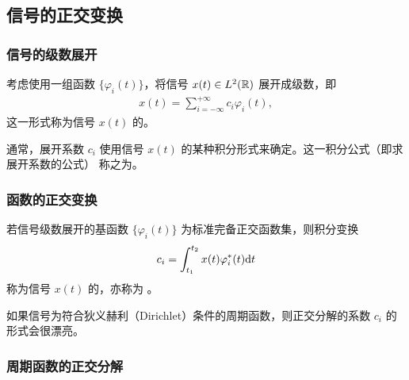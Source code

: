 \subsection{信号的正交变换}

\subsubsection{信号的级数展开}

\begin{definition}[信号的级数展开]
    考虑使用一组函数 $\{\varphi_i(t)\}$，将信号 $x(t) \in L^2(\mathbb{R})$ 展开成级数，即
    \begin{align*}
        x(t) = \sum_{i = -\infty}^{+\infty}c_i\varphi_i(t),
    \end{align*}
    这一形式称为信号 $x(t)$ 的。

    通常，展开系数 $c_i$ 使用信号 $x(t)$ 的某种积分形式来确定。这一积分公式（即求展开系数的公式）
    称之为。
\end{definition}

\subsubsection{函数的正交变换}

\begin{definition}[函数的正交变换]
    若信号级数展开的基函数 $\{\varphi_i(t)\}$ 为标准完备正交函数集，则积分变换
    \begin{align*}
        c_i = \int_{t_1}^{t_2}x(t)\varphi_i^*(t)\mathrm{d}t
    \end{align*}
    称为信号 $x(t)$ 的，亦称为 。
\end{definition}

\begin{note}
    如果信号为符合狄义赫利（Dirichlet）条件的周期函数，则正交分解的系数 $c_i$ 的形式会很漂亮。
\end{note}

\subsubsection{周期函数的正交分解}

